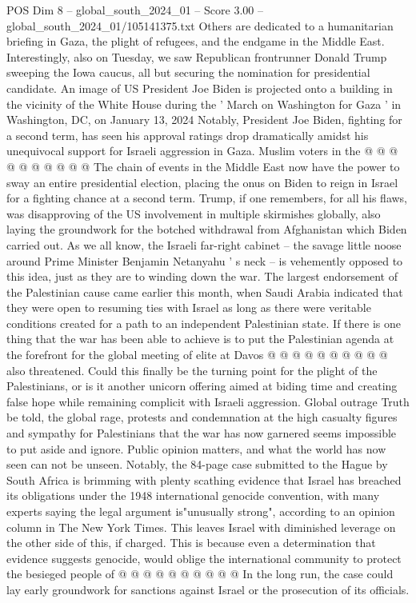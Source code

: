 \begin{textsample}{POS Dim 8 – global\_south\_2024\_01 – Score 3.00 – global\_south\_2024\_01/105141375.txt}
Others are dedicated to a humanitarian briefing in Gaza, the plight of refugees, and the endgame in the Middle East.
Interestingly, also on Tuesday, we saw Republican frontrunner Donald Trump sweeping the Iowa caucus, all but securing the nomination for presidential candidate.
An image of US President Joe Biden is projected onto a building in the vicinity of the White House during the ' March on Washington for Gaza ' in Washington, DC, on January 13, 2024 Notably, President Joe Biden, fighting for a second term, has seen his approval ratings drop dramatically amidst his unequivocal support for Israeli aggression in Gaza.
Muslim voters in the @ @ @ @ @ @ @ @ @ @ The chain of events in the Middle East now have the power to sway an entire presidential election, placing the onus on Biden to reign in Israel for a fighting chance at a second term.
Trump, if one remembers, for all his flaws, was disapproving of the US involvement in multiple skirmishes globally, also laying the groundwork for the botched withdrawal from Afghanistan which Biden carried out.
As we all know, the Israeli far-right cabinet -- the savage little noose around Prime Minister Benjamin Netanyahu ' s neck -- is vehemently opposed to this idea, just as they are to winding down the war.
The largest endorsement of the Palestinian cause came earlier this month, when Saudi Arabia indicated that they were open to resuming ties with Israel as long as there were veritable conditions created for a path to an independent Palestinian state.
If there is one thing that the war has been able to achieve is to put the Palestinian agenda at the forefront for the global meeting of elite at Davos @ @ @ @ @ @ @ @ @ @ also threatened.
Could this finally be the turning point for the plight of the Palestinians, or is it another unicorn offering aimed at biding time and creating false hope while remaining complicit with Israeli aggression.
Global outrage Truth be told, the global rage, protests and condemnation at the high casualty figures and sympathy for Palestinians that the war has now garnered seems impossible to put aside and ignore.
Public opinion matters, and what the world has now seen can not be unseen.
Notably, the 84-page case submitted to the Hague by South Africa is brimming with plenty scathing evidence that Israel has breached its obligations under the 1948 international genocide convention, with many experts saying the legal argument is"unusually strong", according to an opinion column in The New York Times.
This leaves Israel with diminished leverage on the other side of this, if charged.
This is because even a determination that evidence suggests genocide, would oblige the international community to protect the besieged people of @ @ @ @ @ @ @ @ @ @ In the long run, the case could lay early groundwork for sanctions against Israel or the prosecution of its officials.

\end{textsample}
